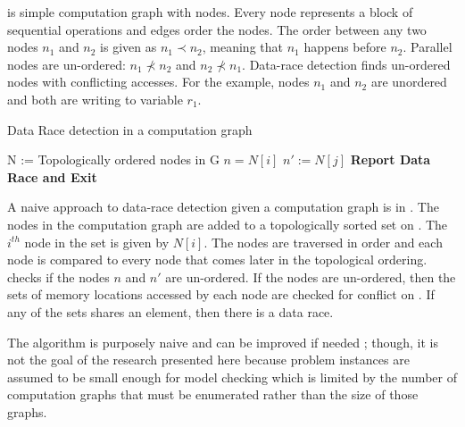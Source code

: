  is simple computation graph with nodes. Every node represents a block of sequential operations and edges order the nodes. The order between any two nodes $n_1$ and $n_2$ is given as $n_1 \prec n_2$, meaning that $n_1$ happens before $n_2$. Parallel nodes are un-ordered: $n_1 \nprec n_2$ and $n_2 \nprec n_1$. Data-race detection finds un-ordered nodes with conflicting accesses. For the example, nodes $n_1$ and $n_2$ are unordered and both are writing to variable $r_1$.

\begin{algorithm}[t]
  \caption{Data Race detection in a computation graph } \label{algo:drd}
\begin{algorithmic}[1]
\State N := Topologically ordered nodes in G \label{loc:topo}
\State $n = N[i]$
\State $n' := N[j]$
  \label{loc:path} \label{loc:forall}
		 \label{loc:intersection}
			\State \textbf{Report Data Race and Exit} \label{loc:datarace}
		\EndIf
\EndIf
 \EndFor
 \EndFor
\EndFunction  
\end{algorithmic}
\end{algorithm}

A naive approach to data-race detection given a computation graph is in . The nodes in the computation graph are added to a topologically sorted set on . The $i^{th}$ node in the set is given by $N[i]$. The nodes are traversed in order and each node is compared to every node that comes later in the topological ordering.  checks if the nodes $n$ and $n'$ are un-ordered. If the nodes are un-ordered, then the sets of memory locations accessed by each node are checked for conflict on . If any of the sets shares an element, then there is a data race.

The algorithm is purposely naive and can be improved if needed \cite{mellor1991fly,raman2012scalable}; though, it is not the goal of the research presented here because problem instances are assumed to be small enough for model checking which is limited by the number of computation graphs that must be enumerated rather than the size of those graphs.

